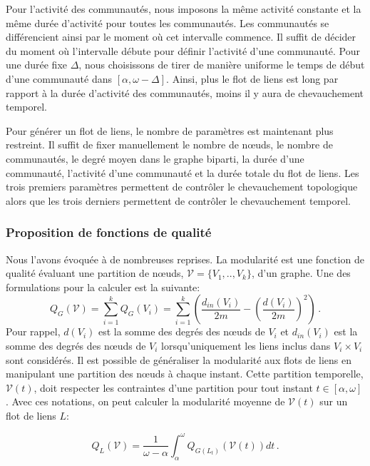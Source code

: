 Pour l'activité des communautés, nous imposons la même activité constante et la même durée d'activité pour toutes les communautés.
Les communautés se différencient ainsi par le moment où cet intervalle commence.
Il suffit de décider du moment où l'intervalle débute pour définir l'activité d'une communauté.
Pour une durée fixe $\Delta$, nous choisissons de tirer de manière uniforme le temps de début d'une communauté dans $[\alpha,\omega-\Delta]$.
Ainsi, plus le flot de liens est long par rapport à la durée d'activité des communautés, moins il y aura de chevauchement temporel.

\bigskip
Pour générer un flot de liens, le nombre de paramètres est maintenant plus restreint.
Il suffit de fixer manuellement le nombre de n\oe{}uds, le nombre de communautés, le degré moyen dans le graphe biparti, la durée d'une communauté, l'activité d'une communauté et la durée totale du flot de liens.
Les trois premiers paramètres permettent de contrôler le chevauchement topologique alors que les trois derniers permettent de contrôler le chevauchement temporel.

\subsubsection{Proposition de fonctions de qualité}

Nous l'avons évoquée à de nombreuses reprises.
La modularité est une fonction de qualité évaluant une partition de n\oe{}uds, $\mathcal{V}=\{V_1,..,V_k\}$, d'un graphe.
Une des formulations pour la calculer est la suivante:
\begin{equation}
Q_G(\mathcal{V}) =  \sum_{i=1}^{k} Q_G(V_i) =\sum_{i=1}^{k} \left( \dfrac{d_{in}(V_i)}{2m}- \left(\dfrac{d(V_i)}{2m}\right)^2\right)\,.
\end{equation}
Pour rappel, $d(V_i)$ est la somme des degrés des n\oe{}uds de $V_i$ et $d_{in}(V_i)$ est la somme des degrés des n\oe{}uds de $V_i$ lorsqu'uniquement les liens inclus dans $V_i \times V_i$ sont considérés.
Il est possible de généraliser la modularité aux flots de liens en manipulant une partition des n\oe{}uds à chaque instant.
Cette partition temporelle, $\mathcal{V}(t)$, doit respecter les contraintes d'une partition pour tout instant $t \in [\alpha,\omega]$.
Avec ces notations, on peut calculer la modularité moyenne de $\mathcal{V}(t)$ sur un flot de liens $L$:

\begin{equation}
Q_L(\mathcal{V}) = \dfrac{1}{\omega-\alpha} \int_{\alpha}^{\omega} Q_{G(L_t)}(\mathcal{V}(t)) dt\,.
\label{eq:temp_modu}
\end{equation}

